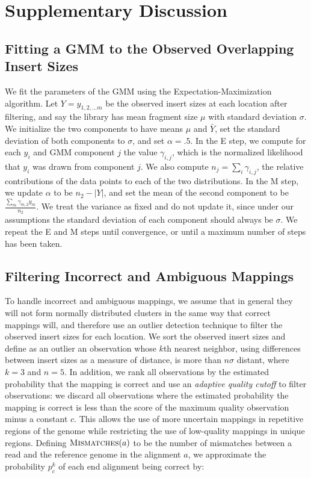 \documentclass[11pt]{article}
\begin{document}
\section{Supplementary Discussion}

\subsection{Fitting a GMM to the Observed Overlapping Insert Sizes}

We fit the parameters of the GMM using the Expectation-Maximization algorithm. Let $Y = y_{1,2, \ldots m}$ be the observed insert sizes at each location after filtering, and say the library has mean fragment size $\mu$ with standard deviation $\sigma$. We initialize the two components to have means $\mu$ and $\bar{Y}$, set the standard deviation of both components to $\sigma$, and set $\alpha = .5$. In the E step, we compute for each $y_i$ and GMM component $j$ the value $\gamma_{i,j}$, which is the normalized likelihood that $y_i$ was drawn from component $j$. We also compute $n_j = \sum_i{\gamma_{i,j}}$, the relative contributions of the data points to each of the two distributions. In the M step, we update $\alpha$ to be $n_2 - \left|Y\right|$, and set the mean of the second component to be $\frac{\sum_m{\gamma_{m,2}y_m}}{n_2}$. We treat the variance as fixed and do not update it, since under our assumptions the standard deviation of each component should always be $\sigma$. We repeat the E and M steps until convergence, or until a maximum number of steps has been taken.

\subsection{Filtering Incorrect and Ambiguous Mappings}

To handle incorrect and ambiguous mappings, we assume that in general they will not form normally distributed clusters in the same way that correct mappings will, and therefore use an outlier detection technique to filter the observed insert sizes for each location. We sort the observed insert sizes and define as an outlier an observation whose $k$th nearest neighbor, using differences between insert sizes as a measure of distance, is more than $n\sigma$ distant, where $k = 3$ and $n = 5$. In addition, we rank all observations by the estimated probability that the mapping is correct and use an \emph{adaptive quality cutoff} to filter observations: we discard all observations where the estimated probability the mapping is correct is less than the score of the maximum quality observation minus a constant $c$. This allows the use of more uncertain mappings in repetitive regions of the genome while restricting the use of low-quality mappings in unique regions. Defining $\textsc{Mismatches}(a)$ to be the number of mismatches between a read and the reference genome in the alignment $a$, we approximate the probability $p^{k}_c$ of each end alignment being correct by:
\end{document}
